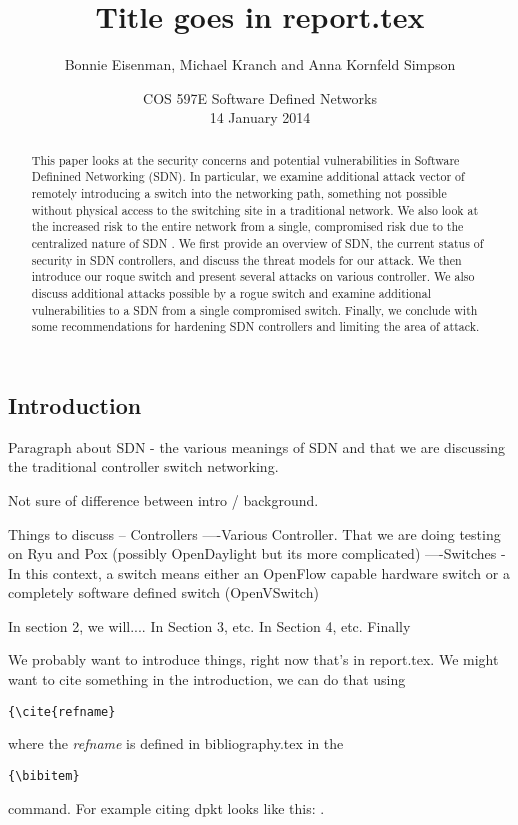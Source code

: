\documentclass[12pt, letterpaper, twoside]{article}
\title{Title goes in report.tex}
\author{Bonnie Eisenman, Michael Kranch and Anna Kornfeld Simpson}
\date{COS 597E Software Defined Networks \\ 14 January 2014}
\begin{document}
\maketitle

\begin{spacing}{1.0}

\begin{abstract}
This paper looks at the security concerns and potential vulnerabilities in Software Definined Networking (SDN). In particular, we examine additional attack vector of remotely introducing a switch into the networking path, something not possible without physical access to the switching site in a traditional network. We also look at the increased risk to the entire network from a single, compromised risk due to the centralized nature of SDN . We first provide an overview of SDN, the current status of security in SDN controllers, and discuss the threat models for our attack. We then introduce our roque switch and present several  attacks on various controller. We also discuss additional attacks possible by a rogue switch and examine additional vulnerabilities to a SDN from a single compromised switch. Finally, we conclude with some recommendations for hardening SDN controllers and limiting the area of attack.
\end{abstract}

\begin{multicols}{2}

\section{Introduction}
Paragraph about SDN - the various meanings of SDN and that we are discussing the traditional controller switch networking.

Not sure of difference between intro / background.

Things to discuss
-- Controllers
----Various Controller. That we are doing testing on Ryu and Pox (possibly OpenDaylight but its more complicated)
----Switches - In this context, a switch means either an OpenFlow capable hardware switch or a completely software defined switch (OpenVSwitch)

In section 2, we will.... In Section 3, etc. In Section 4, etc. Finally

We probably want to introduce things, right now that's in report.tex.  We might want to cite something in the introduction, we can do that using \begin{verbatim}{\cite{refname}\end{verbatim} where the \emph{refname} is defined in bibliography.tex in the \begin{verbatim}{\bibitem}\end{verbatim} command.  For example citing dpkt looks like this: \cite{dpkt}.


\end{multicols}
\end{spacing}
\end{document}
